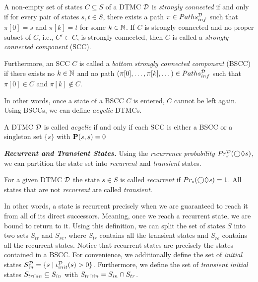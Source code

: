\begin{definition}\label{def:(B)SCC}
    A non-empty set of states $C \subseteq S$ of a DTMC $\mathcal{D}$ is \textit{strongly connected} if and only if for every pair of states $s,t\in S$, there exists a path $\pi \in Paths^{\mathcal{D}}_{inf}$ such that $\pi[0]=s$ and $\pi[k] = t$ for some $k\in \mathbb{N}$.
    If $C$ is strongly connected and no proper subset of $C$, i.e., $C' \subset C$, is strongly connected, then $C$ is called a \textit{strongly connected component} (SCC).
    
    Furthermore, an SCC $C$ is called a \textit{bottom strongly connected component} (BSCC) if there exists no $k\in \mathbb{N}$ and no path $(\pi[0], \dots, \pi[k],\dots) \in Paths^{\mathcal{D}}_{inf}$ such that $\pi[0]\in C$ and $\pi[k] \notin C$.
\end{definition}
In other words, once a state of a BSCC $C$ is entered, $C$ cannot be left again. %
Using BSCCs, we can define \textit{acyclic} DTMCs.
\begin{definition}\label{def:acyclic_DTMC}
    A DTMC $\mathcal{D}$ is called \textit{acyclic} if and only if each SCC is either a BSCC or a singleton set $\{s\}$ with $\mathbf{P}(s,s) = 0$
\end{definition}


\emph{\textbf{Recurrent and Transient States.}} Using the \textit{recurrence probability} $Pr_s^{\mathcal{D}}(\bigcirc\lozenge s)$, we can partition the state set into \textit{recurrent} and \textit{transient} states.

\begin{definition}\label{def:transient_and_recurrent_states}
    For a given DTMC $\mathcal{D}$ the state $s\in S$ is called \textit{recurrent} if $Pr_s(\bigcirc \lozenge s)=1$. All states that are not \textit{recurrent} are called \textit{transient}.
\end{definition}
In other words, a state is recurrent precisely when we are guaranteed to reach it from all of its direct successors. Meaning, once we reach a recurrent state, we are bound to return to it. Using this definition, we can split the set of states $S$ into two sets $S_{tr}$ and $S_{re}$, where $S_{tr}$ contains all the transient states and $S_{re}$ contains all the recurrent states. 
Notice that recurrent states are precisely the states contained in a BSCC.
For convenience, we additionally define the set of \textit{initial} states $S^{\mathcal{D}}_{in} = \{s \mid \iota^{\mathcal{D}}_{init}(s) > 0\}$. Furthermore, we define the set of \textit{transient initial} states $S_{tr\cap in} \subseteq S_{in}$ with $S_{tr\cap in} = S_{in}\cap S_{tr}$. 

